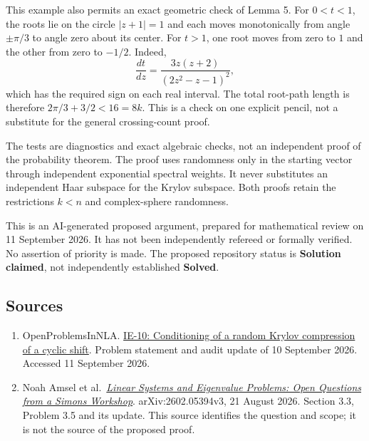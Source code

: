\documentclass[
  11pt,
]{article}
\begin{document}
This example also permits an exact geometric check of Lemma 5. For
\(0<t<1\), the roots lie on the circle \(|z+1|=1\) and each moves
monotonically from angle \(\pm\pi/3\) to angle zero about its center.
For \(t>1\), one root moves from zero to \(1\) and the other from zero
to \(-1/2\). Indeed, \[
\frac{dt}{dz}=\frac{3z(z+2)}{(2z^2-z-1)^2},
\] which has the required sign on each real interval. The total
root-path length is therefore \(2\pi/3+3/2<16=8k\). This is a check on
one explicit pencil, not a substitute for the general crossing-count
proof.

The tests are diagnostics and exact algebraic checks, not an independent
proof of the probability theorem. The proof uses randomness only in the
starting vector through independent exponential spectral weights. It
never substitutes an independent Haar subspace for the Krylov subspace.
Both proofs retain the restrictions \(k<n\) and complex-sphere
randomness.

This is an AI-generated proposed argument, prepared for mathematical
review on 11 September 2026. It has not been independently refereed or
formally verified. No assertion of priority is made. The proposed
repository status is \textbf{Solution claimed}, not independently
established \textbf{Solved}.

\subsection{Sources}\label{sources}

\begin{enumerate}
\def\labelenumi{\arabic{enumi}.}
\item
  OpenProblemsInNLA.
  \href{https://github.com/ajt60gaibb/OpenProblemsInNLA/blob/main/eigenvalues-and-inverse-problems/IE-10/README.md}{IE-10:
  Conditioning of a random Krylov compression of a cyclic shift}.
  Problem statement and audit update of 10 September 2026. Accessed 11
  September 2026.
\item
  Noah Amsel et
  al.~\href{https://arxiv.org/html/2602.05394v3}{\emph{Linear Systems
  and Eigenvalue Problems: Open Questions from a Simons Workshop}}.
  arXiv:2602.05394v3, 21 August 2026. Section 3.3, Problem 3.5 and its
  update. This source identifies the question and scope; it is not the
  source of the proposed proof.
\end{enumerate}
\end{document}
